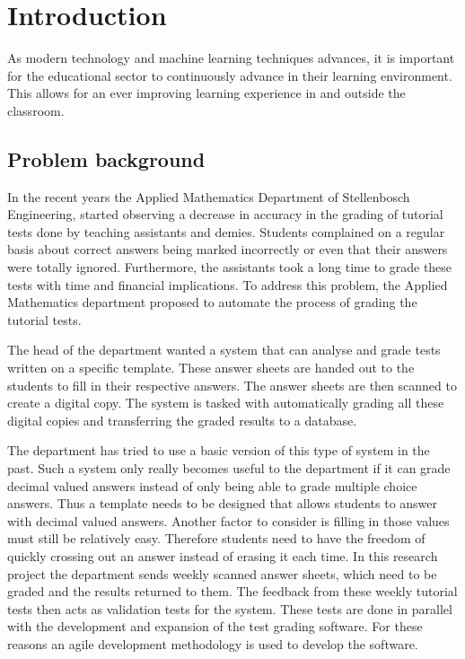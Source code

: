 \chapter{Introduction}
\label{ch:Introduction}
\graphicspath{{Chapter1/Chapter1Figures/}}
As modern technology and machine learning techniques advances, it is important for the educational sector to continuously advance in their learning environment. This allows for an ever improving learning experience in and outside the classroom. 

\section{Problem background}
In the recent years the Applied Mathematics Department of Stellenbosch Engineering, started observing a decrease in accuracy in the grading of tutorial tests done by teaching assistants and demies.  Students complained on a regular basis about correct answers being marked incorrectly or even that their answers were totally ignored. Furthermore, the assistants took a long time to grade these tests with time and financial implications. To address this problem, the Applied Mathematics department proposed to automate the process of grading the tutorial tests.

The head of the department wanted a system that can analyse and grade tests written on a specific template. These answer sheets are handed out to the students to fill in their respective answers. The answer sheets are then scanned to create a digital copy. The system is tasked with automatically grading all these digital copies and transferring the graded results to a database.

The department has tried to use a basic version of this type of system in the past. Such a system only really becomes useful to the department if it can grade decimal valued answers instead of only being able to grade multiple choice answers. Thus a template needs to be designed that allows students to answer with decimal valued answers. Another factor to consider is filling in those values must still be relatively easy. Therefore students need to have the freedom of quickly crossing out an answer instead of erasing it each time.
In this research project the department sends weekly scanned answer sheets, which need to be graded and the results returned to them. The feedback from these weekly tutorial tests then acts as validation tests for the system. These tests are done in parallel with the development and expansion of the test grading software. For these reasons an agile development methodology is used to develop the software.

